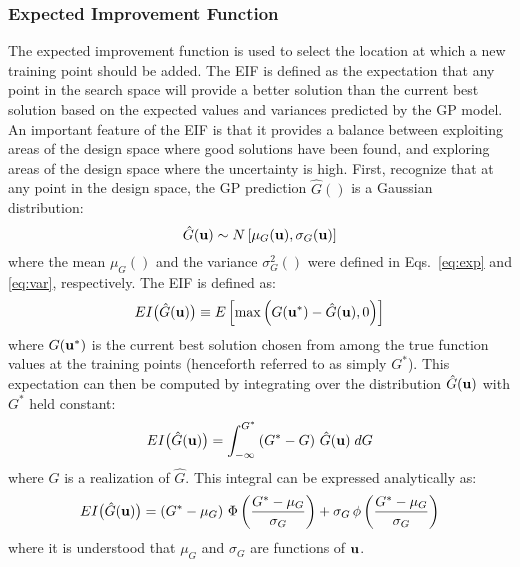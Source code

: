 \subsubsection{Expected Improvement Function}\label{uq:reliability:global:ego:eif}

The expected improvement function is used to select the location at which a 
new training point should be added.
The EIF is defined as the expectation that any point in the search
space will provide a better solution than the current best solution
based on the expected values and variances predicted by the GP model.
An important feature of the EIF is that it provides a balance between 
exploiting areas of the design space where good solutions have been found, and 
exploring areas of the design space where the uncertainty is high.
First, recognize that at any point in the design space, the GP prediction
$\hat{G}()$ is a Gaussian distribution:
\begin{equation}
\hat{G}({\bf u}) \sim N\left[ \mu_G({\bf u}), \sigma_G({\bf u}) \right]
\end{equation}
\noindent where the mean $\mu_G()$ and the variance $\sigma_G^2()$ were 
defined in Eqs.~\ref{eq:exp} and \ref{eq:var}, respectively.
The EIF is defined as:~\cite{Jon98}
\begin{equation}
EI\bigl( \hat{G}({\bf u}) \bigr) \equiv 
  E\left[ \max \left( G({\bf u}^*) - \hat{G}({\bf u}),0 \right) \right]  
\end{equation}
\noindent where $G({\bf u}^*)$ is the current best solution chosen from among 
the true function values at the training points (henceforth referred to as
simply $G^*$).
This expectation can then be computed by integrating over the distribution 
$\hat{G}({\bf u})$ with $G^*$ held constant:
\begin{equation}
EI\bigl( \hat{G}({\bf u}) \bigr) = 
  \int_{-\infty}^{G^*} \left( G^* - G \right) \, \hat{G}({\bf u}) \; dG  
  \label{eq:eif_int}
\end{equation}
\noindent where $G$ is a realization of $\hat{G}$.
This integral can be expressed analytically as:~\cite{Jon98}
\begin{equation}
EI\bigl( \hat{G}({\bf u}) \bigr) = \left( G^* - \mu_G \right) \,
  \Phi\left( \frac{G^* - \mu_G}{\sigma_G} \right) + \sigma_G \,
  \phi\left( \frac{G^* - \mu_G}{\sigma_G} \right) \label{eq:eif}
\end{equation}
\noindent where it is understood that $\mu_G$ and $\sigma_G$ are functions of 
${\bf u}$.

